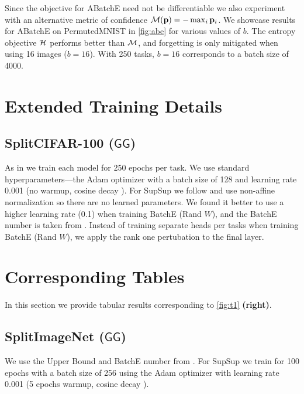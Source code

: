 \documentclass{article}
\newcommand{\ac}{SupSup\xspace}
\newcommand{\casename}[1]{\ensuremath{\mathsf{#1}}\xspace}
\begin{document}
Since the objective for ABatchE need not be differentiable we also experiment with an alternative metric of confidence $\mathcal{M}(\mathbf{p}) = -\max_i \mathbf{p}_i$.
We showcase results for ABatchE on PermutedMNIST in \autoref{fig:abe} for various values of $b$. The entropy objective $\mathcal{H}$ performs better than $\mathcal{M}$, and forgetting is only mitigated when using 16 images ($b=16$). With 250 tasks, $b=16$ corresponds to a batch size of 4000.

\section{Extended Training Details} \label{sec:hyperparams}
\subsection{SplitCIFAR-100 (\casename{GG})}

As in \cite{wen2020batchensemble} we train each model for 250 epochs per task. We use standard hyperparameters---the Adam optimizer \cite{kingma2014adam} with a batch size of 128 and learning rate 0.001 (no warmup, cosine decay \cite{cosine}). For \ac we follow \cite{ramanujan2019s} and use non-affine normalization so there are no learned parameters. We found it better to use a higher learning rate (0.1) when training BatchE (Rand $W$), and the BatchE number is taken from \cite{wen2020batchensemble}. Instead of training separate heads per tasks when training BatchE (Rand $W$), we apply the rank one pertubation to the final layer.

\section{Corresponding Tables}\label{sec:tables}
In this section we provide tabular results corresponding to \autoref{fig:t1} \textbf{(right)}.
\begin{table}[H]
    \centering
    \caption{Accuracy on SplitCIFAR100 corresponding to \autoref{fig:t1} \textbf{(right)}. \ac with Transfer approaches upper bound.}
    
    \label{tab:t1}
\end{table}

\subsection{SplitImageNet (\casename{GG})}
We use the Upper Bound and BatchE number from \cite{wen2020batchensemble}. For \ac we train for 100 epochs with a batch size of 256 using the Adam optimizer \cite{kingma2014adam} with learning rate 0.001 (5 epochs warmup, cosine decay \cite{cosine}).
\end{document}
